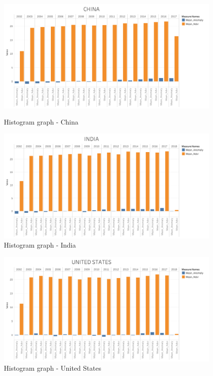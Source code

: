 \begin{itemize}
     \begin{figure}[!htb]
        \begin{minipage}{0.5\textwidth}
            \centering
            \includegraphics[width=1.0\linewidth]{figures/ch5/Histograms/CHINA_histogram.png}
            \caption{Histogram graph - China}\label{Fig:CHINA_histogram}
        \end{minipage}\hfill
        \begin{minipage}{0.5\textwidth}
            \centering
            \includegraphics[width=1.0\linewidth]{figures/ch5/Histograms/INDIA_histogram.png}
            \caption{Histogram graph - India}\label{Fig:INDIA_histogram}
        \end{minipage}
    \end{figure}
    
     \begin{figure}[H]
            \centering
            \includegraphics[width=0.5\linewidth]{figures/ch5/Histograms/US_histogram.png}
            \caption{\label{fig:US_histogram} Histogram graph - United States}
    \end{figure}
\newpage

\end{itemize}



